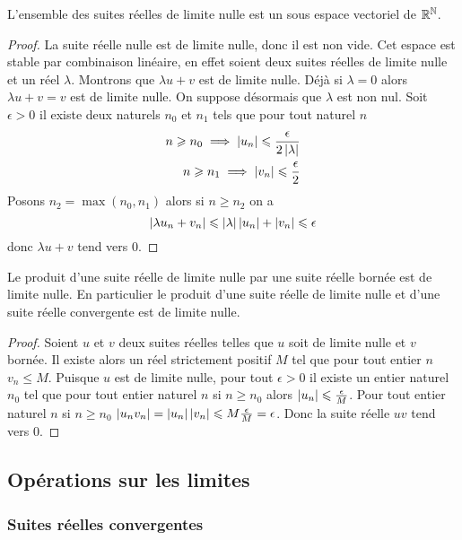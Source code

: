 \begin{prop}
  L'ensemble des suites réelles de limite nulle est un sous espace vectoriel de $\mathbb{R}^{\mathbb{N}}$.
\end{prop}
\begin{proof}
  La suite réelle nulle est de limite nulle, donc il est non vide. Cet espace est stable par combinaison linéaire, en effet soient deux suites réelles de limite nulle et un réel $\lambda$. Montrons que $\lambda u+v$ est de limite nulle. Déjà si $\lambda=0$ alors $\lambda u+v=v$ est de limite nulle. On suppose désormais que $\lambda$ est non nul. Soit $\epsilon>0$ il existe deux naturels $n_0$ et $n_1$ tels que pour tout naturel $n$
  \begin{align}
    n \geqslant n_0 \implies \left\lvert u_n\right\rvert \leqslant \frac{\epsilon}{2\left\lvert\lambda\right\rvert} \\ n \geqslant n_1 \implies \left\lvert v_n\right\rvert \leqslant \frac{\epsilon}{2}
  \end{align}
  Posons $n_2=\max(n_0,n_1)$ alors si $n \geqslant n_2$ on a
  \begin{equation}
    \left\lvert\lambda u_n + v_n\right\rvert\leqslant \left\lvert\lambda\right\rvert\left\lvert u_n\right\rvert+\left\lvert v_n\right\rvert\leqslant \epsilon
  \end{equation}
  donc $\lambda u+v$ tend vers 0.
\end{proof}
%
\begin{prop}
  Le produit d'une suite réelle de limite nulle par une suite réelle bornée est de limite nulle. En particulier le produit d'une suite réelle de limite nulle et d'une suite réelle convergente est de limite nulle.
\end{prop}
\begin{proof}
  Soient $u$ et $v$ deux suites réelles telles que $u$ soit de limite nulle et $v$ bornée. Il existe alors un réel strictement positif $M$ tel que pour tout entier $n$ $v_n \leqslant M$. Puisque $u$ est de limite nulle, pour tout $\epsilon>0$ il existe un entier naturel $n_0$ tel que pour tout entier naturel $n$ si $n \geqslant n_0$ alors $\left\lvert u_n\right\rvert \leqslant \frac{\epsilon}{M}$. Pour tout entier naturel $n$  si $n \geqslant n_0$ $\left\lvert u_n v_n\right\rvert=\left\lvert u_n\right\rvert\left\lvert v_n\right\rvert\leqslant M \frac{\epsilon}{M}=\epsilon$. Donc la suite réelle $uv$ tend vers 0.
\end{proof}

\subsection{Opérations sur les limites}

\subsubsection{Suites réelles convergentes}

